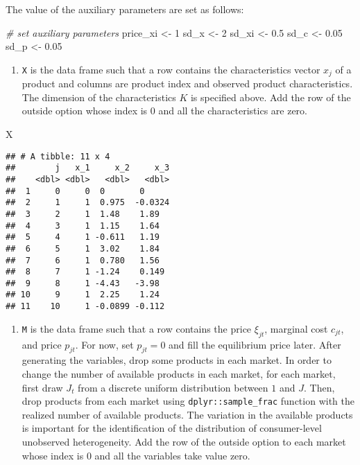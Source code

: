 \documentclass[
]{book}
\newenvironment{Shaded}{\begin{snugshade}}{\end{snugshade}}
\newcommand{\CommentTok}[1]{\textcolor[rgb]{0.56,0.35,0.01}{\textit{#1}}}
\newcommand{\DecValTok}[1]{\textcolor[rgb]{0.00,0.00,0.81}{#1}}
\newcommand{\FloatTok}[1]{\textcolor[rgb]{0.00,0.00,0.81}{#1}}
\newcommand{\NormalTok}[1]{#1}
\newcommand{\StringTok}[1]{\textcolor[rgb]{0.31,0.60,0.02}{#1}}
\providecommand{\tightlist}{%
  \setlength{\itemsep}{0pt}\setlength{\parskip}{0pt}}
\begin{document}
The value of the auxiliary parameters are set as follows:

\begin{Shaded}
\begin{Highlighting}[]
\CommentTok{# set auxiliary parameters}
\NormalTok{price_xi <-}\StringTok{ }\DecValTok{1}
\NormalTok{sd_x <-}\StringTok{ }\DecValTok{2}
\NormalTok{sd_xi <-}\StringTok{ }\FloatTok{0.5}
\NormalTok{sd_c <-}\StringTok{ }\FloatTok{0.05}
\NormalTok{sd_p <-}\StringTok{ }\FloatTok{0.05}
\end{Highlighting}
\end{Shaded}

\begin{enumerate}
\def\labelenumi{\arabic{enumi}.}
\setcounter{enumi}{1}
\tightlist
\item
  \texttt{X} is the data frame such that a row contains the characteristics vector \(x_{j}\) of a product and columns are product index and observed product characteristics. The dimension of the characteristics \(K\) is specified above. Add the row of the outside option whose index is \(0\) and all the characteristics are zero.
\end{enumerate}

\begin{Shaded}
\begin{Highlighting}[]
\NormalTok{X}
\end{Highlighting}
\end{Shaded}

\begin{verbatim}
## # A tibble: 11 x 4
##        j   x_1     x_2     x_3
##    <dbl> <dbl>   <dbl>   <dbl>
##  1     0     0  0       0     
##  2     1     1  0.975  -0.0324
##  3     2     1  1.48    1.89  
##  4     3     1  1.15    1.64  
##  5     4     1 -0.611   1.19  
##  6     5     1  3.02    1.84  
##  7     6     1  0.780   1.56  
##  8     7     1 -1.24    0.149 
##  9     8     1 -4.43   -3.98  
## 10     9     1  2.25    1.24  
## 11    10     1 -0.0899 -0.112
\end{verbatim}

\begin{enumerate}
\def\labelenumi{\arabic{enumi}.}
\setcounter{enumi}{2}
\tightlist
\item
  \texttt{M} is the data frame such that a row contains the price \(\xi_{jt}\), marginal cost \(c_{jt}\), and price \(p_{jt}\). For now, set \(p_{jt} = 0\) and fill the equilibrium price later. After generating the variables, drop some products in each market. In order to change the number of available products in each market, for each market, first draw \(J_t\) from a discrete uniform distribution between \(1\) and \(J\). Then, drop products from each market using \texttt{dplyr::sample\_frac} function with the realized number of available products. The variation in the available products is important for the identification of the distribution of consumer-level unobserved heterogeneity. Add the row of the outside option to each market whose index is \(0\) and all the variables take value zero.
\end{enumerate}
\end{document}
